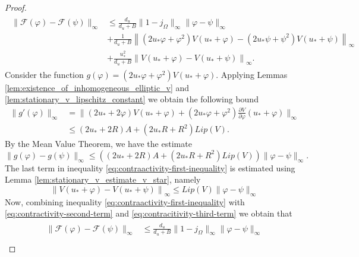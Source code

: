 \documentclass[12pt, a4paper]{article}
\theoremstyle{break}
\theoremstyle{break}
\theoremstyle{break}
\theoremstyle{break}
\theoremstyle{break}
\theoremstyle{break}
\theoremstyle{break}
\begin{document}
\begin{proof}
    \begin{align}
        \label{eq:contraactivity-first-inequality}
        \begin{split}
            \|\mathcal{F}(\varphi) - \mathcal{F}(\psi)\|_\infty
            &\leq
            \frac{d_u}{d_u + B} \|1 - j_\Omega\|_\infty \|\varphi - \psi\|_\infty \\
            &+ \frac{1}{d_u + B} \left\|(2u_* \varphi + \varphi^2) V(u_* + \varphi)
            - (2u_* \psi + \psi^2) V(u_* + \psi) \right\|_\infty \\
            &+ \frac{u_*^2}{d_u + B}\left\| V(u_* + \varphi) - V(u_* + \psi) \right\|_\infty.
        \end{split}
    \end{align}
    Consider the function $g(\varphi) = (2u_*\varphi + \varphi^2)V(u_* + \varphi)$. Applying Lemmas \ref{lem:existence_of_inhomogeneous_elliptic_v} and \ref{lem:stationary_v_lipschitz_constant} we obtain the following bound
    \begin{align*}
        \|g'(\varphi)\|_\infty 
        &= 
        \|(2u_* + 2 \varphi)V(u_* + \varphi) + (2u_* \varphi + \varphi^2) \frac{\partial V}{\partial \varphi}(u_* + \varphi)\|_\infty \\
        &\leq
        (2u_* + 2R) A + (2u_*R + R^2) Lip(V).
    \end{align*}
    By the Mean Value Theorem, we have the estimate
    \begin{equation}
        \label{eq:contractivity-second-term}
        \|g(\varphi) - g(\psi)\|_\infty \leq \left( (2u_* + 2R) A + (2u_*R + R^2) Lip(V) \right) \|\varphi - \psi\|_\infty.
    \end{equation}
    The last term in inequality \eqref{eq:contraactivity-first-inequality} is estimated using Lemma \ref{lem:stationary_v_estimate_v_star}, namely
    \begin{equation}
        \label{eq:contracitivity-third-term}
        \left\| V(u_* + \varphi) - V(u_* + \psi) \right\|_\infty
        \leq
        Lip(V)\|\varphi - \psi\|_\infty
    \end{equation}
    Now, combining inequality \eqref{eq:contraactivity-first-inequality} with \eqref{eq:contractivity-second-term} and \eqref{eq:contracitivity-third-term} we obtain that
    \begin{align}
        \label{eq:contractivity-final-inequality}
        \begin{split}
            \|\mathcal{F}(\varphi) - \mathcal{F}(\psi)\|_\infty
            &\leq
            \frac{d_u}{d_u + B} \|1 - j_\Omega\|_\infty \|\varphi - \psi\|_\infty\\

\end{split}
\end{align}
\end{proof}
\end{document}
